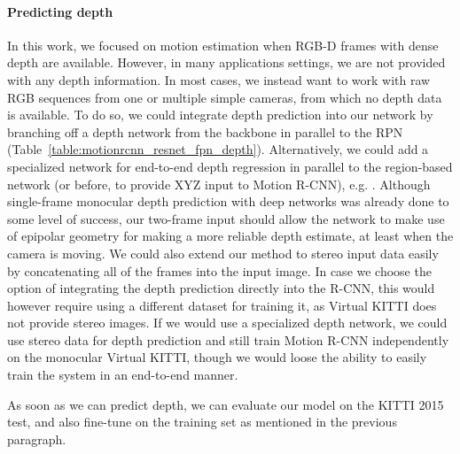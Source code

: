 \paragraph{Predicting depth}
In this work, we focused on motion estimation when RGB-D frames with dense depth are available.
However, in many applications settings, we are not provided with any depth information.
In most cases, we instead want to work with raw RGB sequences from one or multiple simple cameras,
from which no depth data is available.
To do so, we could integrate depth prediction into our network by branching off a
depth network from the backbone in parallel to the RPN (Table~\ref{table:motionrcnn_resnet_fpn_depth}).
Alternatively, we could add a specialized network for end-to-end depth regression
in parallel to the region-based network (or before, to provide XYZ input to Motion R-CNN), e.g. \cite{GCNet}.
Although single-frame monocular depth prediction with deep networks was already done
to some level of success,
our two-frame input should allow the network to make use of epipolar
geometry for making a more reliable depth estimate, at least when the camera
is moving. We could also extend our method to stereo input data easily by concatenating
all of the frames into the input image.
In case we choose the option of integrating the depth prediction directly into
the R-CNN,
this would however require using a different dataset for training it, as Virtual KITTI does not
provide stereo images.
If we would use a specialized depth network, we could use stereo data
for depth prediction and still train Motion R-CNN independently on the monocular Virtual KITTI,
though we would loose the ability to easily train the system in an end-to-end manner.

As soon as we can predict depth, we can evaluate our model on the KITTI 2015 test,
and also fine-tune on the training set as mentioned in the previous paragraph.

